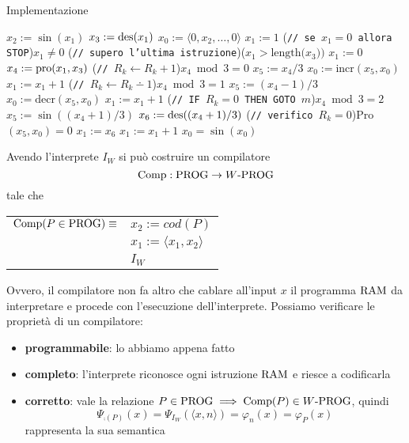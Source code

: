Implementazione 
\begin{tcolorbox}[colback=white,sharp corners,boxrule=.3mm]
	\begin{algorithm}[H]
		\SetAlgoNoEnd
		$x_2 := \sin(x_1)$\;
		$x_3 := \operatorname{des}(x_1)$\;
		$x_0 := \langle 0,x_2,\dots,0 \rangle$\;
		$x_1 := 1$\;
		\While(\hfill\texttt{// se $x_1=0$ allora STOP}){$x_1\neq 0$}{
			\eIf(\hfill\texttt{// supero l'ultima istruzione}){($x_1>\text{length($x_3$))}$}{
				$x_1:=0$
			}{
				$x_4 := \text{pro}(x_1,x_3)$
				\If(\hfill\texttt{// }$R_k\leftarrow R_k+1$){$x_4\bmod{3}=0$}{
					$x_5 := x_4 / 3$
					$x_0 := \text{incr}(x_5,x_0)$\;
					$x_1 := x_1+1$\;
				}
				\If(\hfill\texttt{// }$R_k\leftarrow R_k\dotminus1$){$x_4\bmod{3}=1$}{
					$x_5 := (x_4-1) / 3$
					$x_0 := \text{decr}(x_5,x_0)$\;
					$x_1 := x_1+1$\;
				}
				\If(\hfill\texttt{// IF $R_k=0$ THEN GOTO $m$}){$x_4\bmod{3}=2$}{
					$x_5 := \sin((x_4+1)/3)$
					$x_6 := \operatorname{des}((x_4+1)/3)$
					\eIf(\hfill\texttt{// verifico }$R_k=0$){Pro$(x_5,x_0)=0$}{
						$x_1:=x_6$\;
					}{
						$x_1:=x_1+1$\;
					}
				}
			}
		}
		$x_0 = \sin(x_0)$
	\end{algorithm}
\end{tcolorbox}

Avendo l'interprete $I_W$ si può costruire un compilatore
$$ \text{Comp}: \text{PROG} \rightarrow W\text{-PROG} $$
tale che 
\begin{center}
	\begin{tabular}{r|l|}
		\cline{2-2}
		$\text{Comp} (P \in \text{PROG}) \equiv$	& $x_2 := cod(P)$ \\
			& $x_1 := \langle x_1, x_2 \rangle$ \\
			& $I_W$ \\
		\cline{2-2}
	\end{tabular}
\end{center}

Ovvero, il compilatore non fa altro che cablare all'input $x$ il programma $\text{RAM}$ da interpretare e procede con l'esecuzione dell'interprete. Possiamo verificare le proprietà di un compilatore: 
\begin{itemize}
	\item \textbf{programmabile}: lo abbiamo appena fatto
	\item \textbf{completo}: l'interprete riconosce ogni istruzione $\text{RAM}$ e riesce a codificarla
	\item \textbf{corretto}: vale la relazione $P \in \text{PROG} \implies \text{Comp} (P) \in W\text{-PROG}$, quindi
	$$ \Psi_{\comp (P)} (x) = \Psi_{I_W} (\langle x,n \rangle) = \varphi_n (x) = \varphi_P (x) $$
	rappresenta la sua semantica
\end{itemize}

